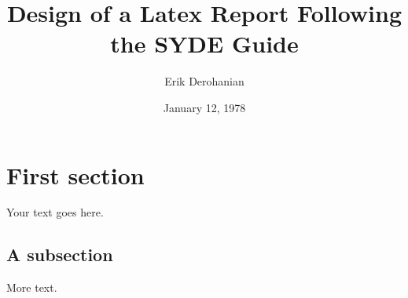 \documentclass[twoside, 12pt]{article}
\title{Design of a Latex Report Following the SYDE Guide}
\author{Erik Derohanian}
\date{January 12, 1978}
\begin{document}
\maketitle

\section{First section}

Your text goes here.

\subsection{A subsection}

More text.
\end{document}
